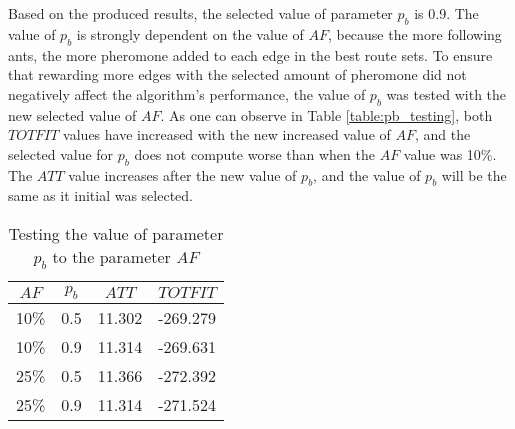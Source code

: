 Based on the produced results, the selected value of parameter $p_b$ is 0.9. The value of $p_b$ is strongly dependent on the value of $AF$, because the more following ants, the more pheromone added to each edge in the best route sets. To ensure that rewarding more edges with the selected amount of pheromone did not negatively affect the algorithm's performance, the value of $p_b$ was tested with the new selected value of $AF$. As one can observe in Table \vref{table:pb_testing}, both $TOTFIT$ values have increased with the new increased value of $AF$, and the selected value for $p_b$ does not compute worse than when the $AF$ value was 10\%. The $ATT$ value increases after the new value of $p_b$, and the value of $p_b$ will be the same as it initial was selected. 

    \begin{table}[H]
    \centering
    \begin{tabular}{|c|c||c|c|}
    \hline
    $AF$ & $p_b$ & $ATT$ & $TOTFIT$\\
    \hline
    10\% & 0.5 & 11.302 & -269.279 \\
    10\% & 0.9 & 11.314 & -269.631 \\
    25\% & 0.5 & 11.366 & -272.392 \\
    25\% & 0.9 & 11.314 & -271.524 \\
    \hline
    \end{tabular}
    \caption {Testing the value of parameter $p_b$ to the parameter $AF$}
    \label{table:pb_testing}
    \end{table}





